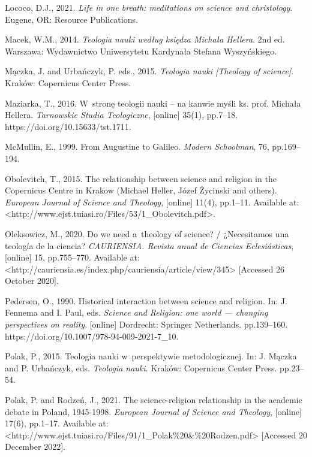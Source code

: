 Lococo, D.J., 2021. \textit{Life in one breath: meditations on science and christology}. Eugene, OR: Resource Publications.



Macek, W.M., 2014. \textit{Teologia nauki według księdza Michała Hellera}. 2nd ed. Warszawa: Wydawnictwo Uniwersytetu Kardynała Stefana Wyszyńskiego.



Mączka, J. and Urbańczyk, P. eds., 2015. \textit{Teologia nauki [Theology of science]}. Kraków: Copernicus Center Press.



Maziarka, T., 2016. W~stronę teologii nauki -- na kanwie myśli ks. prof. Michała Hellera. \textit{Tarnowskie Studia Teologiczne}, [online] 35(1), pp.7–18. https://doi.org/10.15633/tst.1711.



McMullin, E., 1999. From Augustine to Galileo. \textit{Modern Schoolman}, 76, pp.169–194.



Obolevitch, T., 2015. The relationship between science and religion in the Copernicus Centre in Krakow (Michael Heller, Józef Życinski and others). \textit{European Journal of Science and Theology}, [online] 11(4), pp.1–11. Available at: {\textless}http://www.ejst.tuiasi.ro/Files/53/1\_Obolevitch.pdf{\textgreater}.



Oleksowicz, M., 2020. Do we need a~theology of science? / ¿Necesitamos una teología de la ciencia? \textit{CAURIENSIA. Revista anual de Ciencias Eclesiásticas}, [online] 15, pp.755–770. Available at: {\textless}http://cauriensia.es/index.php/cauriensia/article/view/345{\textgreater} [Accessed 26 October 2020].



Pedersen, O., 1990. Historical interaction between science and religion. In: J. Fennema and I. Paul, eds. \textit{Science and Religion: one world --- changing perspectives on reality}. [online] Dordrecht: Springer Netherlands. pp.139–160. https://doi.org/10.1007/978-94-009-2021-7\_10.



Polak, P., 2015. Teologia nauki w~perspektywie metodologicznej. In: J. Mączka and P. Urbańczyk, eds. \textit{Teologia nauki}. Kraków: Copernicus Center Press. pp.23–54.



Polak, P. and Rodzeń, J., 2021. The science-religion relationship in the academic debate in Poland, 1945-1998. \textit{European Journal of Science and Theology}, [online] 17(6), pp.1–17. Available at: {\textless}http://www.ejst.tuiasi.ro/Files/91/1\_Polak\%20\&\%20Rodzen.pdf{\textgreater} [Accessed 20 December 2022].



